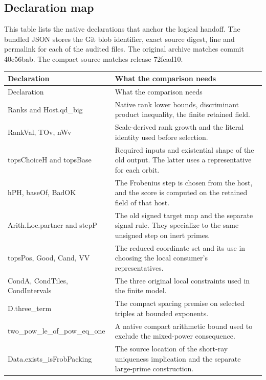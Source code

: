 \documentclass[12pt,letterpaper]{article}
\DeclareRobustCommand{\id}[1]{\mbox{\small\ttfamily #1}}
\begin{document}
\subsection{Declaration map}

This table lists the native declarations that anchor the logical handoff. The bundled JSON stores the Git blob identifier, exact source digest, line and permalink for each of the audited files. The original archive matches commit \id{40e56bab}. The compact source matches release \id{72fead10}.

\begin{longtable}{@{}p{.33\linewidth}p{.60\linewidth}@{}}
\toprule
Declaration & What the comparison needs\\
\midrule
\endfirsthead
\toprule
Declaration & What the comparison needs\\
\midrule
\endhead
\id{Ranks} and \id{Host.qd\_big}
 & Native rank lower bounds, discriminant product inequality, the finite retained field.\\
\id{RankVal}, \id{TOv}, \id{nWv}
 & Scale-derived rank growth and the literal identity used before selection.\\
\id{topsChoiceH} and \id{topsBase}
 & Required inputs and existential shape of the old output. The latter uses a representative for each orbit.\\
\id{hPH}, \id{baseOf}, \id{BadOK}
 & The Frobenius step is chosen from the host, and the score is computed on the retained field of that host.\\
\id{Arith.Loc.partner} and \id{stepP}
 & The old signed target map and the separate signal rule. They specialize to the same unsigned step on inert primes.\\
\id{topsPos}, \id{Good}, \id{Cand}, \id{VV}
 & The reduced coordinate set and its use in choosing the local consumer's representatives.\\
\id{CondA}, \id{CondTiles}, \id{CondIntervals}
 & The three original local constraints used in the finite model.\\
\id{D.three\_term}
 & The compact spacing premise on selected triples at bounded exponents.\\
\id{two\_pow\_le\_of\_pow\_eq\_one}
 & A native compact arithmetic bound used to exclude the mixed-power consequence.\\
\id{Data.exists\_isFrobPacking}
 & The source location of the short-ray uniqueness implication and the separate large-prime construction.\\
\bottomrule
\end{longtable}
\end{document}
